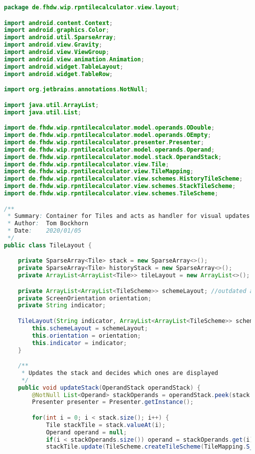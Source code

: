 \begin{lstlisting}[caption=TileLayout,label=list:TileLayout,language=Java]
package de.fhdw.wip.rpntilecalculator.view.layout;

import android.content.Context;
import android.graphics.Color;
import android.util.SparseArray;
import android.view.Gravity;
import android.view.ViewGroup;
import android.view.animation.Animation;
import android.widget.TableLayout;
import android.widget.TableRow;

import org.jetbrains.annotations.NotNull;

import java.util.ArrayList;
import java.util.List;

import de.fhdw.wip.rpntilecalculator.model.operands.ODouble;
import de.fhdw.wip.rpntilecalculator.model.operands.OEmpty;
import de.fhdw.wip.rpntilecalculator.presenter.Presenter;
import de.fhdw.wip.rpntilecalculator.model.operands.Operand;
import de.fhdw.wip.rpntilecalculator.model.stack.OperandStack;
import de.fhdw.wip.rpntilecalculator.view.Tile;
import de.fhdw.wip.rpntilecalculator.view.TileMapping;
import de.fhdw.wip.rpntilecalculator.view.schemes.HistoryTileScheme;
import de.fhdw.wip.rpntilecalculator.view.schemes.StackTileScheme;
import de.fhdw.wip.rpntilecalculator.view.schemes.TileScheme;

/**
 * Summary: Container for Tiles and acts as handler for visual updates
 * Author:  Tom Bockhorn
 * Date:    2020/01/05
 */
public class TileLayout {

    private SparseArray<Tile> stack = new SparseArray<>();
    private SparseArray<Tile> historyStack = new SparseArray<>();
    private ArrayList<ArrayList<Tile>> tileLayout = new ArrayList<>();

    private ArrayList<ArrayList<TileScheme>> schemeLayout; //outdated after a single operation
    private ScreenOrientation orientation;
    private String indicator;

    TileLayout(String indicator, ArrayList<ArrayList<TileScheme>> schemeLayout, ScreenOrientation orientation) {
        this.schemeLayout = schemeLayout;
        this.orientation = orientation;
        this.indicator = indicator;
    }

    /**
     * Updates the stack and decides which ones are displayed
     */
    public void updateStack(OperandStack operandStack) {
        @NotNull List<Operand> stackOperands = operandStack.peek(stack.size());
        Presenter presenter = Presenter.getInstance();

        for(int i = 0; i < stack.size(); i++) {
            Tile stackTile = stack.valueAt(i);
            Operand operand = null;
            if(i < stackOperands.size()) operand = stackOperands.get(i);
            stackTile.update(TileScheme.createTileScheme(TileMapping.S_STACK, operand, stack.keyAt(i)));


\end{lstlisting}
